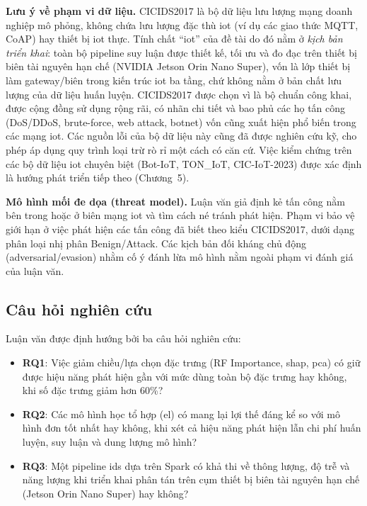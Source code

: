 \textbf{Lưu ý về phạm vi dữ liệu.} CICIDS2017 là bộ dữ liệu lưu lượng mạng doanh nghiệp mô phỏng, không chứa lưu lượng đặc thù \ac{iot} (ví dụ các giao thức MQTT, CoAP) hay thiết bị \ac{iot} thực. Tính chất ``\ac{iot}'' của đề tài do đó nằm ở \emph{kịch bản triển khai}: toàn bộ pipeline suy luận được thiết kế, tối ưu và đo đạc trên thiết bị biên tài nguyên hạn chế (NVIDIA Jetson Orin Nano Super), vốn là lớp thiết bị làm gateway/biên trong kiến trúc \ac{iot} ba tầng, chứ không nằm ở bản chất lưu lượng của dữ liệu huấn luyện. CICIDS2017 được chọn vì là bộ chuẩn công khai, được cộng đồng sử dụng rộng rãi, có nhãn chi tiết và bao phủ các họ tấn công (DoS/DDoS, brute-force, web attack, botnet) vốn cũng xuất hiện phổ biến trong các mạng \ac{iot}. Các nguồn lỗi của bộ dữ liệu này cũng đã được nghiên cứu kỹ, cho phép áp dụng quy trình loại trừ rò rỉ một cách có căn cứ. Việc kiểm chứng trên các bộ dữ liệu \ac{iot} chuyên biệt (Bot-IoT, TON\_IoT, CIC-IoT-2023) được xác định là hướng phát triển tiếp theo (Chương~5).

\textbf{Mô hình mối đe dọa (threat model).} Luận văn giả định kẻ tấn công nằm bên trong hoặc ở biên mạng \ac{iot} và tìm cách né tránh phát hiện. Phạm vi bảo vệ giới hạn ở việc phát hiện các tấn công đã biết theo kiểu CICIDS2017, dưới dạng phân loại nhị phân Benign/Attack. Các kịch bản đối kháng chủ động (adversarial/evasion) nhằm cố ý đánh lừa mô hình nằm ngoài phạm vi đánh giá của luận văn.

\subsection{Câu hỏi nghiên cứu}
\label{sec:CauHoi}
Luận văn được định hướng bởi ba câu hỏi nghiên cứu:
\begin{itemize}
  \item \textbf{RQ1}: Việc giảm chiều/lựa chọn đặc trưng (RF Importance, \ac{shap}, \ac{pca}) có giữ được hiệu năng phát hiện gần với mức dùng toàn bộ đặc trưng hay không, khi số đặc trưng giảm hơn 60\%?
  \item \textbf{RQ2}: Các mô hình học tổ hợp (\ac{el}) có mang lại lợi thế đáng kể so với mô hình đơn tốt nhất hay không, khi xét cả hiệu năng phát hiện lẫn chi phí huấn luyện, suy luận và dung lượng mô hình?
  \item \textbf{RQ3}: Một pipeline \ac{ids} dựa trên Spark có khả thi về thông lượng, độ trễ và năng lượng khi triển khai phân tán trên cụm thiết bị biên tài nguyên hạn chế (Jetson Orin Nano Super) hay không?
\end{itemize}


